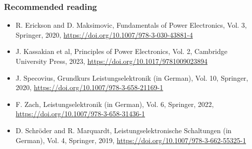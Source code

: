 \begin{frame}
	\frametitle{Recommended reading}
	\begin{itemize}
		\item R. Erickson and D. Maksimovic, Fundamentals of Power Electronics, Vol. 3, Springer, 2020, \url{https://doi.org/10.1007/978-3-030-43881-4}
		\item J. Kassakian et al, Principles of Power Electronics, Vol. 2,  Cambridge University Press, 2023, \url{https://doi.org/10.1017/9781009023894}
		\item J. Specovius, Grundkurs Leistungselektronik (in German), Vol. 10, Springer, 2020, \url{https://doi.org/10.1007/978-3-658-21169-1}
		\item F. Zach, Leistungselektronik (in German), Vol. 6, Springer, 2022, \url{https://doi.org/10.1007/978-3-658-31436-1}
		\item D. Schröder and R. Marquardt, Leistungselektronische	Schaltungen (in German), Vol. 4, Springer, 2019, \url{https://doi.org/10.1007/978-3-662-55325-1}
	\end{itemize}
\end{frame}